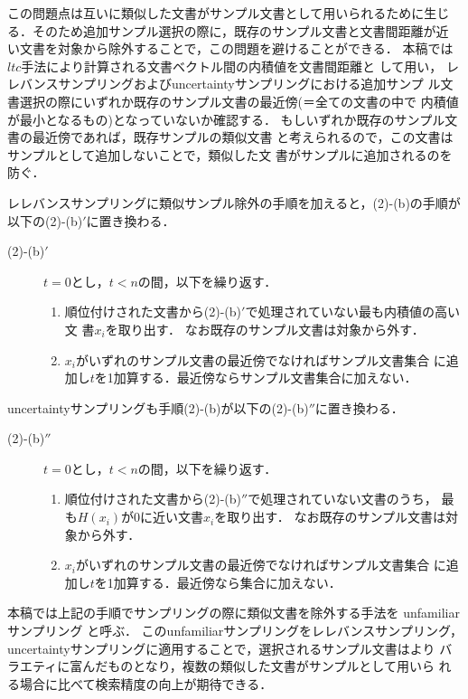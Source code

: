この問題点は互いに類似した文書がサンプル文書として用いられるために生じ
る．そのため追加サンプル選択の際に，既存のサンプル文書と文書間距離が近
い文書を対象から除外することで，この問題を避けることができる．
本稿では$ltc$手法により計算される文書ベクトル間の内積値を文書間距離と
して用い，
レレバンスサンプリングおよびuncertaintyサンプリングにおける追加サンプ
ル文書選択の際にいずれか既存のサンプル文書の最近傍(＝全ての文書の中で
内積値が最小となるもの)となっていないか確認する．
もしいずれか既存のサンプル文書の最近傍であれば，既存サンプルの類似文書
と考えられるので，この文書はサンプルとして追加しないことで，類似した文
書がサンプルに追加されるのを防ぐ．

レレバンスサンプリングに類似サンプル除外の手順を加えると，(2)-(b)の手順が
以下の(2)-(b)\('\)に置き換わる．
\begin{description}
\item[(2)-(b)\('\)] $t=0$とし，$t < n$の間，以下を繰り返す．
\begin{enumerate}
\item 順位付けされた文書から(2)-(b)\('\)で処理されていない最も内積値の高い文
書$x_{i}$を取り出す．
なお既存のサンプル文書は対象から外す．
\item $x_{i}$がいずれのサンプル文書の最近傍でなければサンプル文書集合
に追加し$t$を1加算する．最近傍ならサンプル文書集合に加えない．
\end{enumerate}	
\end{description}

uncertaintyサンプリングも手順(2)-(b)が以下の(2)-(b)\(''\)に置き換わる．
\begin{description}
\item[(2)-(b)\(''\)] 
$t=0$とし，$t < n$の間，以下を繰り返す．
\begin{enumerate}
\item 順位付けされた文書から(2)-(b)\(''\)で処理されていない文書のうち，
最も$H(x_{i})$が0に近い文書$x_{i}$を取り出す．
なお既存のサンプル文書は対象から外す．
\item $x_{i}$がいずれのサンプル文書の最近傍でなければサンプル文書集合
に追加し$t$を1加算する．最近傍なら集合に加えない．
\end{enumerate}	
\end{description}

本稿では上記の手順でサンプリングの際に類似文書を除外する手法を
unfamiliarサンプリング
と呼ぶ．
このunfamiliarサンプリングをレレバンスサンプリング，
uncertaintyサンプリングに適用することで，選択されるサンプル文書はより
バラエティに富んだものとなり，複数の類似した文書がサンプルとして用いら
れる場合に比べて検索精度の向上が期待できる．

